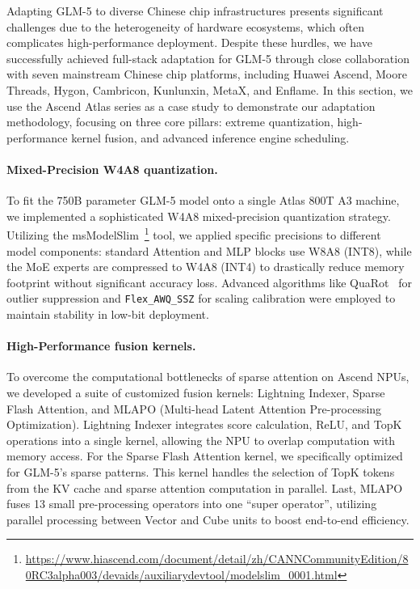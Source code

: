 \documentclass{article}
\theoremstyle{definition}
\begin{document}
Adapting GLM-5 to diverse Chinese chip infrastructures presents significant challenges due to the heterogeneity of hardware ecosystems, which often complicates high-performance deployment. Despite these hurdles, we have successfully achieved full-stack adaptation for GLM-5 through close collaboration with seven mainstream Chinese chip platforms, including Huawei Ascend, Moore Threads, Hygon, Cambricon, Kunlunxin, MetaX, and Enflame. In this section, we use the Ascend Atlas series as a case study to demonstrate our adaptation methodology, focusing on three core pillars: extreme quantization, high-performance kernel fusion, and advanced inference engine scheduling.

\paragraph{Mixed-Precision W4A8 quantization.}
To fit the 750B parameter GLM-5 model onto a single Atlas 800T A3 machine, we implemented a sophisticated W4A8 mixed-precision quantization strategy. Utilizing the msModelSlim~\footnote{\url{https://www.hiascend.com/document/detail/zh/CANNCommunityEdition/80RC3alpha003/devaids/auxiliarydevtool/modelslim_0001.html}} tool, we applied specific precisions to different model components: standard Attention and MLP blocks use W8A8 (INT8), while the MoE experts are compressed to W4A8 (INT4) to drastically reduce memory footprint without significant accuracy loss. Advanced algorithms like QuaRot~\cite{ashkboos2024quarotoutlierfree4bitinference} for outlier suppression and \texttt{Flex\_AWQ\_SSZ} for scaling calibration were employed to maintain stability in low-bit deployment.

\paragraph{High-Performance fusion kernels.}
To overcome the computational bottlenecks of sparse attention on Ascend NPUs, we developed a suite of customized fusion kernels: Lightning Indexer, Sparse Flash Attention, and MLAPO (Multi-head Latent Attention Pre-processing Optimization). 
Lightning Indexer integrates score calculation, ReLU, and TopK operations into a single kernel, allowing the NPU to overlap computation with memory access.
For the Sparse Flash Attention kernel, we specifically optimized for GLM-5's sparse patterns. This kernel handles the selection of TopK tokens from the KV cache and sparse attention computation in parallel.
Last, MLAPO fuses 13 small pre-processing operators into one ``super operator'', utilizing parallel processing between Vector and Cube units to boost end-to-end efficiency.
\end{document}
